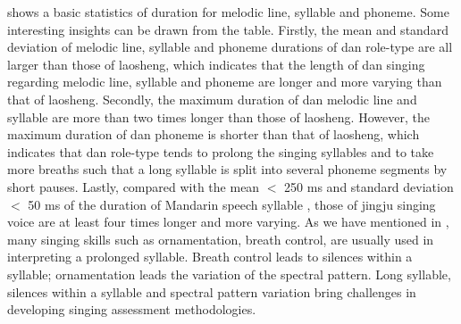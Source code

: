  shows a basic statistics of duration for melodic line, syllable and phoneme. Some interesting insights can be drawn from the table. Firstly, the mean and standard deviation of melodic line, syllable and phoneme durations of dan role-type are all larger than those of laosheng, which indicates that the length of dan singing regarding melodic line, syllable and phoneme are longer and more varying than that of laosheng. Secondly, the maximum duration of dan melodic line and syllable are more than two times longer than those of laosheng. However, the maximum duration of dan phoneme is shorter than that of laosheng, which indicates that dan role-type tends to prolong the singing syllables and to take more breaths such that a long syllable is split into several phoneme segments by short pauses. Lastly, compared with the mean $<$ 250 ms and standard deviation $<$ 50 ms of the duration of Mandarin speech syllable \cite{wang_syllable_1994}, those of jingju singing voice are at least four times longer and more varying. As we have mentioned in , many singing skills such as ornamentation, breath control, are usually used in interpreting a prolonged syllable. Breath control leads to silences within a syllable; ornamentation leads the variation of the spectral pattern. Long syllable, silences within a syllable and spectral pattern variation bring challenges in developing singing assessment methodologies.

